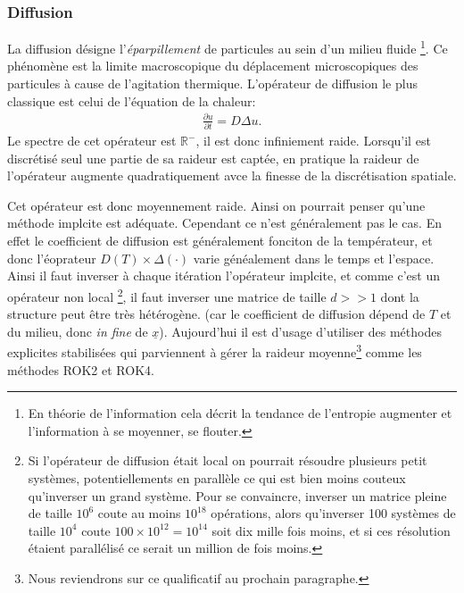 \subsubsection{Diffusion}
    La diffusion désigne l'\textit{éparpillement} de particules au sein d'un milieu fluide
    \footnote{En théorie de l'information cela décrit la tendance de l'entropie augmenter et l'information à se moyenner, se flouter.}.
    Ce phénomène est la limite macroscopique du déplacement microscopiques 
    des particules à cause de l'agitation thermique. L'opérateur de diffusion le plus classique est celui de l'équation de la chaleur:
    \begin{align} \frac{\partial u}{\partial t} = D \Delta u.\end{align}
    Le spectre de cet opérateur est $\mathbb R^-$, il est donc infiniement raide. Lorsqu'il est discrétisé seul une partie de sa raideur est captée,
    en pratique la raideur de l'opérateur augmente quadratiquement avce la finesse de la discrétisation spatiale.\par
    Cet opérateur est donc moyennement raide. Ainsi on pourrait penser qu'une méthode implcite est adéquate. Cependant ce n'est généralement pas le cas.
    En effet le coefficient de diffusion est généralement fonciton de la températeur, et donc l'éoprateur $D(T) \times \Delta(\cdot)$ varie généalement dans le temps et l'espace. 
    Ainsi il faut inverser à chaque itération l'opérateur implcite, et comme c'est un opérateur non local
    \footnote{Si l'opérateur de diffusion était local on pourrait résoudre plusieurs petit systèmes, potentiellements en parallèle ce qui est bien moins couteux qu'inverser 
    un grand système. Pour se convaincre, inverser un matrice pleine de taille $10^6$ coute au moins $10^{18}$ opérations, alors qu'inverser 100 systèmes de taille $10^4$
    coute $100 \times 10^{12} = 10^{14}$ soit dix mille fois moins, et si ces résolution étaient parallélisé ce serait un million de fois moins.},
    il faut inverser une matrice de taille $d >> 1$ dont la structure
    peut être très hétérogène.
    (car le coefficient de diffusion dépend de $T$ et du milieu, donc \textit{in fine} de $\underline x$). Aujourd'hui il est d'usage d'utiliser 
    des méthodes explicites stabilisées qui parviennent à gérer la raideur moyenne\footnote{Nous reviendrons sur ce qualificatif au prochain paragraphe.} comme les méthodes 
    ROK2 et ROK4\cite{abdulle2002fourth}.

